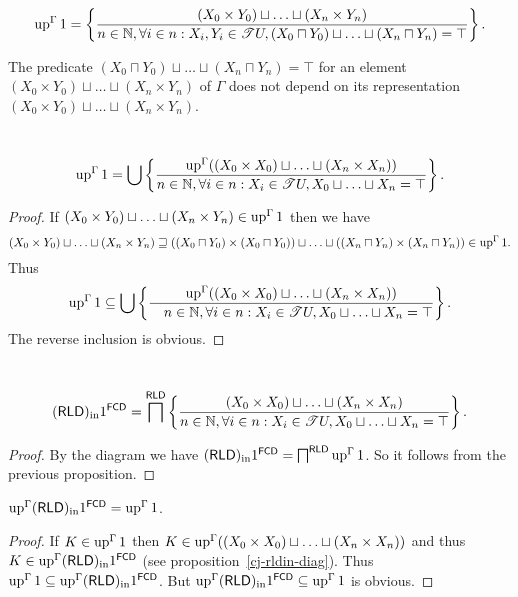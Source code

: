 \begin{cor}
  ~
  \[ \operatorname{up}^{\Gamma} 1 = \left\{ \frac{ (X_0 \times Y_0) \sqcup \ldots \sqcup (X_n
     \times Y_n) }{ n \in \mathbb{N}, \forall i \in
     n : X_i, Y_i \in \mathscr{T} U, (X_0 \sqcap Y_0) \sqcup \ldots \sqcup
     (X_n \sqcap Y_n) = \top }\right\} . \]
\end{cor}

\begin{cor}
  The predicate
  $(X_0 \sqcap Y_0) \sqcup \ldots \sqcup (X_n \sqcap Y_n) = \top$ for an
  element $(X_0 \times Y_0) \sqcup \ldots \sqcup (X_n \times Y_n)$ of $\Gamma$
  does not depend on its representation $(X_0 \times Y_0) \sqcup \ldots \sqcup
  (X_n \times Y_n)$.
\end{cor}

\begin{prop}
  ~
  \[ \operatorname{up}^{\Gamma} 1 = \bigcup \left\{ \frac{ \operatorname{up}^{\Gamma} ((X_0 \times
     X_0) \sqcup \ldots \sqcup (X_n \times X_n)) }{ n
     \in \mathbb{N}, \forall i \in n : X_i \in \mathscr{T} U, X_0 \sqcup
     \ldots \sqcup X_n = \top }\right\} . \]
\end{prop}

\begin{proof}
  If $(X_0 \times Y_0) \sqcup \ldots \sqcup (X_n \times Y_n) \in
  \operatorname{up}^{\Gamma} 1$ then we have
  \[ (X_0 \times Y_0) \sqcup \ldots \sqcup (X_n \times Y_n) \sqsupseteq ((X_0
     \sqcap Y_0) \times (X_0 \sqcap Y_0)) \sqcup \ldots \sqcup ((X_n \sqcap
     Y_n) \times (X_n \sqcap Y_n)) \in \operatorname{up}^{\Gamma} 1. \]
  Thus
  \[ \operatorname{up}^{\Gamma} 1 \subseteq \bigcup \left\{ \frac{ \operatorname{up}^{\Gamma} ((X_0
     \times X_0) \sqcup \ldots \sqcup (X_n \times X_n)) }{
     \hspace{1em} n \in \mathbb{N}, \forall i \in n : X_i \in \mathscr{T} U,
     X_0 \sqcup \ldots \sqcup X_n = \top }\right\} . \]
  The reverse inclusion is obvious.
\end{proof}

\begin{prop}
  ~
  \[ (\mathsf{RLD})_{\mathrm{in}} 1^{\mathsf{FCD}} =
     \bigsqcap^{\mathsf{RLD}} \left\{ \frac{ (X_0 \times X_0) \sqcup \ldots
     \sqcup (X_n \times X_n) }{ n \in \mathbb{N},
     \forall i \in n : X_i \in \mathscr{T} U, X_0 \sqcup \ldots \sqcup X_n =
     \top }\right\} . \]
\end{prop}

\begin{proof}
  By the diagram we have $(\mathsf{RLD})_{\mathrm{in}}
  1^{\mathsf{FCD}} = \bigsqcap^{\mathsf{RLD}} \operatorname{up}^{\Gamma} 1$. So it follows from the previous proposition.
\end{proof}

\begin{prop}
  $\operatorname{up}^{\Gamma} (\mathsf{RLD})_{\mathrm{in}} 1^{\mathsf{FCD}} = \operatorname{up}^{\Gamma} 1$.
\end{prop}

\begin{proof}
  If $K \in \operatorname{up}^{\Gamma} 1$ then $K \in \operatorname{up}^{\Gamma} ((X_0 \times
  X_0) \sqcup \ldots \sqcup (X_n \times X_n))$ and thus $K \in
  \operatorname{up}^{\Gamma}  (\mathsf{RLD})_{\mathrm{in}}
  1^{\mathsf{FCD}}$ (see proposition~\ref{cj-rldin-diag}). Thus $\operatorname{up}^{\Gamma}
  1 \subseteq \operatorname{up}^{\Gamma}  (\mathsf{RLD})_{\mathrm{in}}
  1^{\mathsf{FCD}}$. But $\operatorname{up}^{\Gamma} 
  (\mathsf{RLD})_{\mathrm{in}} 1^{\mathsf{FCD}} \subseteq
  \operatorname{up}^{\Gamma} 1$ is obvious.
\end{proof}

